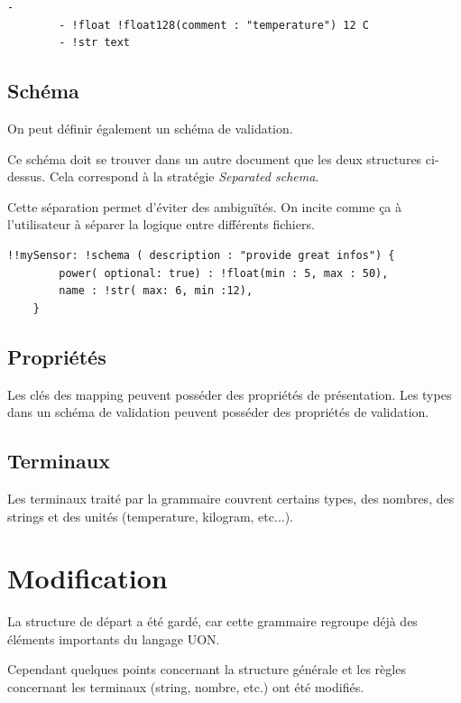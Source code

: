 \documentclass[
    iict, %
    il, %
]{heig-tb}
\begin{document}
\begin{lstlisting}[frame=single,caption={Exemple d'une séquence en format YAML},captionpos=b,label={yaml-seq}]
    -
        - !float !float128(comment : "temperature") 12 C
        - !str text
\end{lstlisting}

\subsection{Schéma}
On peut définir également un schéma de validation.

Ce schéma doit se trouver dans un autre document que les deux structures ci-dessus. Cela correspond à la stratégie \emph{Separated schema}.

Cette séparation permet d'éviter des ambiguïtés. On incite comme ça à l'utilisateur à séparer la logique entre différents fichiers.

\begin{lstlisting}[frame=single,caption={Exemple d'un schéma de validation},captionpos=b,label={schema}]
    !!mySensor: !schema ( description : "provide great infos") {
        power( optional: true) : !float(min : 5, max : 50),
        name : !str( max: 6, min :12),
    }
\end{lstlisting}

\subsection{Propriétés}
Les clés des mapping peuvent posséder des propriétés de présentation.
Les types dans un schéma de validation peuvent posséder des propriétés de validation.

\subsection{Terminaux}
Les terminaux traité par la grammaire couvrent certains types, des nombres, des strings et des unités (temperature, kilogram, etc...).

\section{Modification}\label{modification}

La structure de départ a été gardé, car cette grammaire regroupe déjà des éléments importants du langage UON.

Cependant quelques points concernant la structure générale et les règles concernant les terminaux (string, nombre, etc.) ont été modifiés.
\end{document}
